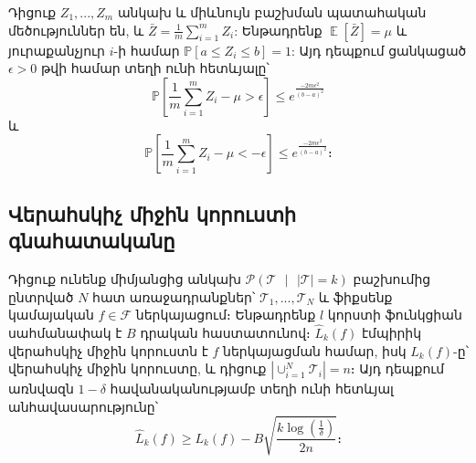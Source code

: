 \documentclass[12pt]{article}
\DeclareMathOperator*{\E}{\mathbb{E}}
\begin{document}
\begin{lemma}
\label{hofding_inq}
Դիցուք $Z_1, ..., Z_m$ անկախ և միևնույն բաշխման պատահական մեծություններ են, և $\bar{Z} = \frac{1}{m}\sum_{i=1}^m{Z_i}$: Ենթադրենք $\E[\bar{Z}] = \mu$ և յուրաքանչյուր $i$-ի համար $\mathbb{P}[a \leq Z_i \leq b] = 1$: Այդ դեպքում ցանկացած $\epsilon > 0$ թվի համար տեղի ունի հետևյալը՝
$$\mathbb{P}\left[ \frac{1}{m}\sum_{i=1}^m{Z_i}-\mu > \epsilon \right] \leq e^{\frac{-2m\epsilon^2}{(b-a)^2}}$$ 
և
$$\mathbb{P}\left[ \frac{1}{m}\sum_{i=1}^m{Z_i}-\mu < -\epsilon \right] \leq e^{\frac{-2m\epsilon^2}{(b-a)^2}}։$$ 
\end{lemma}

\subsection*{\hfill Վերահսկիչ միջին կորուստի գնահատականը \hfill} \noindent
{}
{}

\begin{lemma}
\label{task_conc_lemm}
Դիցուք ունենք միմյանցից անկախ $\mathcal{P}(\mathcal{T} \text{ } |\text{ }  |\mathcal{T}| = k)$ բաշխումից ընտրված $N$ հատ առաջադրանքներ՝ $\mathcal{T}_1, ..., \mathcal{T}_N$ և ֆիքսենք կամայական $f \in \mathcal{F}$ ներկայացում։ Ենթադրենք $l$ կորստի ֆունկցիան սահմանափակ է $B$ դրական հաստատունով։ $\hat{L}_k(f)$ էմպիրիկ վերահսկիչ միջին կորուստն է $f$ ներկայացման համար,  իսկ $L_k(f)$-ը՝ վերահսկիչ միջին կորուստը, և դիցուք $|\cup_{i=1}^N{\mathcal{T}_i}| = n$։
Այդ դեպքում առնվազն $1-\delta$ հավանականությամբ տեղի ունի հետևյալ անհավասարությունը՝
\begin{equation}
\hat{L}_k(f) \geq L_k(f) - B\sqrt{\frac{k\log \left(\frac{1}{\delta}\right) }{2n}}։
\end{equation}
\end{lemma}
\end{document}
